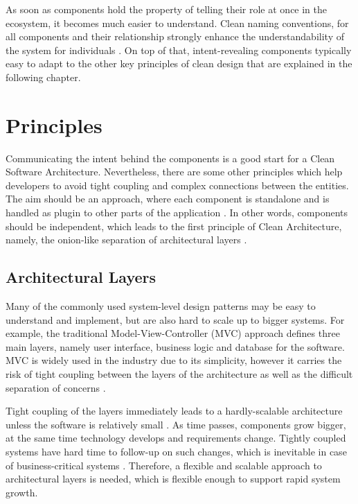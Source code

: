 \documentclass[conference]{IEEEtran}
\begin{document}
As soon as components hold the property of telling their role at once in the ecosystem, it becomes much easier to understand. Clean naming conventions, for all components and their relationship strongly enhance the understandability of the system for individuals \cite{cleancode}. On top of that, intent-revealing components typically easy to adapt to the other key principles of clean design that are explained in the following chapter.

\section{Principles}
Communicating the intent behind the components is a good start for a Clean Software Architecture. Nevertheless, there are some other principles which help developers to avoid tight coupling and complex connections between the entities. The aim should be an approach, where each component is standalone and is handled as plugin to other parts of the application \cite{cleancode} \cite{cleanarchitecture}. In other words, components should be independent, which leads to the first principle of Clean Architecture, namely, the onion-like separation of architectural layers \cite{cleanarchitecture}. 

\subsection{Architectural Layers}
Many of the commonly used system-level design patterns may be easy to understand and implement, but are also hard to scale up to bigger systems. For example, the traditional Model-View-Controller (MVC) approach defines three main layers, namely user interface, business logic and database for the software. MVC is widely used in the industry due to its simplicity, however it carries the risk of tight coupling between the layers of the architecture as well as the difficult separation of concerns \cite{onionarchitecture}. 

Tight coupling of the layers immediately leads to a hardly-scalable architecture unless the software is relatively small \cite{onionarchitecture}. As time passes, components grow bigger, at the same time technology develops and requirements change. Tightly coupled systems have hard time to follow-up on such changes, which is inevitable in case of business-critical systems \cite{onionarchitecture}. Therefore, a flexible and scalable approach to architectural layers is needed, which is flexible enough to support rapid system growth. 
\end{document}
